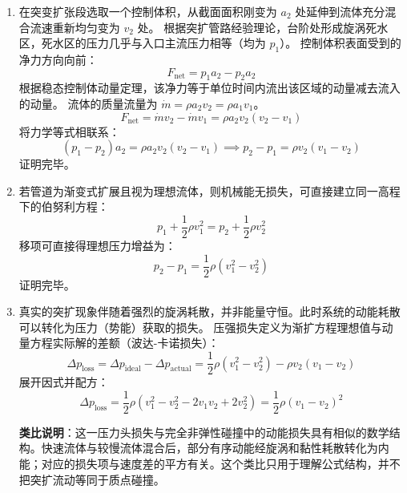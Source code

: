 \begin{solution}
\begin{enumerate}
    \item[(a)] 在突变扩张段选取一个控制体积，从截面面积刚变为 $a_2$ 处延伸到流体充分混合流速重新均匀变为 $v_2$ 处。
    根据突扩管路经验理论，台阶处形成旋涡死水区，死水区的压力几乎与入口主流压力相等（均为 $p_1$）。
    控制体积表面受到的净力方向向前：
    $$ F_{\text{net}} = p_1 a_2 - p_2 a_2 $$
    根据稳态控制体动量定理，该净力等于单位时间内流出该区域的动量减去流入的动量。
    流体的质量流量为 $\dot{m} = \rho a_2 v_2 = \rho a_1 v_1$。
    $$ F_{\text{net}} = \dot{m} v_2 - \dot{m} v_1 = \rho a_2 v_2 (v_2 - v_1) $$
    将力学等式相联系：
    $$ (p_1 - p_2) a_2 = \rho a_2 v_2 (v_2 - v_1) \implies p_2 - p_1 = \rho v_2 (v_1 - v_2) $$
    证明完毕。

    \item[(b)] 若管道为渐变式扩展且视为理想流体，则机械能无损失，可直接建立同一高程下的伯努利方程：
    $$ p_1 + \frac{1}{2} \rho v_1^2 = p_2 + \frac{1}{2} \rho v_2^2 $$
    移项可直接得理想压力增益为：
    $$ p_2 - p_1 = \frac{1}{2} \rho (v_1^2 - v_2^2) $$
    证明完毕。

    \item[(c)] 真实的突扩现象伴随着强烈的旋涡耗散，并非能量守恒。此时系统的动能耗散可以转化为压力（势能）获取的损失。
    压强损失定义为渐扩方程理想值与动量方程实际解的差额（波达-卡诺损失）：
    $$ \Delta p_{\text{loss}} = \Delta p_{\text{ideal}} - \Delta p_{\text{actual}} = \frac{1}{2} \rho (v_1^2 - v_2^2) - \rho v_2 (v_1 - v_2) $$
    展开因式并配方：
    $$ \Delta p_{\text{loss}} = \frac{1}{2} \rho (v_1^2 - v_2^2 - 2v_1 v_2 + 2v_2^2) = \frac{1}{2} \rho (v_1 - v_2)^2 $$
    
    \textbf{类比说明}：这一压力头损失与完全非弹性碰撞中的动能损失具有相似的数学结构。快速流体与较慢流体混合后，部分有序动能经旋涡和黏性耗散转化为内能；对应的损失项与速度差的平方有关。这个类比只用于理解公式结构，并不把突扩流动等同于质点碰撞。
\end{enumerate}
\end{solution}


